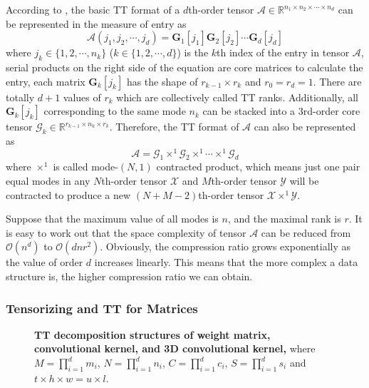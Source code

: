 \documentclass[a4paper,fleqn]{cas-dc}
\begin{document}
According to \citet{Oseledets_2011_InventTT}, the basic TT format of a \(d\)th-order tensor \(\bm{\mathcal{A}} \in \mathbb{R} ^{n_{1} \times n_{2} \times \cdots \times n_{d}}\) can be represented in the measure of entry as
\begin{equation}\label{Eq_TTBaseElement}
\mathcal{A}(j_{1},j_{2},\cdots,j_{d}) = \bm{G}_{1}[j_{1}] \bm{G}_{2}[j_{2}] \cdots \bm{G}_{d}[j_{d}]
\end{equation}
where \( j_{k} \in \{1,2,\cdots,n_{k}\} \) (\( k \in \{1,2,\cdots,d\} \)) is the \( k \)th index of the entry in tensor \( \bm{\mathcal{A}} \), serial products on the right side of the equation are core matrices to calculate the entry, each matrix \( \bm{G}_{k}[j_{k}] \) has the shape of \( r_{k-1} \times r_{k} \) and \( r_{0}=r_{d}=1 \). There are totally \( d+1 \) values of \( r_{k} \) which are collectively called TT ranks.  Additionally, all \( \bm{G}_{k}[j_{k}] \) corresponding to the same mode \(n_{k}\) can be stacked into a \( 3 \)rd-order core tensor \( \bm{\mathcal{G}}_{k} \in \mathbb{R} ^{r_{k-1} \times n_{k} \times r_{k}} \). Therefore, the TT format of \(\bm{\mathcal{A}}\) can also be represented as \citep{Lee_2016_HTTT}
\begin{equation}\label{Eq_TTBaseTensor}
\bm{\mathcal{A}} = \bm{\mathcal{G}}_{1} \times ^{1} \bm{\mathcal{G}}_{2} \times ^{1} \cdots \times ^{1} \bm{\mathcal{G}}_{d}
\end{equation}
where \( \times ^{1} \) is called mode-\( (N,1) \) contracted product, which means just one pair equal modes in any \( N \)th-order tensor \( \bm{\mathcal{X}} \) and \( M \)th-order tensor \( \bm{\mathcal{Y}} \) will be contracted to produce a new \( (N+M-2) \)th-order tensor \(\bm{\mathcal{X}} \times ^{1} \bm{\mathcal{Y}}\).

Suppose that the maximum value of all modes is \(n\), and the maximal rank is \(r\). It is easy to work out that the space complexity of tensor \(\bm{\mathcal{A}}\) can be reduced from \(\mathcal{O}(n^{d})\) to \(\mathcal{O}(dnr^2)\). Obviously, the compression ratio grows exponentially as the value of order \(d\) increases linearly. This means that the more complex a data structure is, the higher compression ratio we can obtain.

\subsubsection{Tensorizing and TT for Matrices}\quad

\begin{figure*}
\centering
{}
\caption{\textbf{TT decomposition structures of weight matrix, convolutional kernel, and 3D convolutional kernel,} where \(M = \prod_{i=1}^d m_i\), \(N = \prod_{i=1}^d n_i\), \(C = \prod_{i=1}^d c_i\), \(S = \prod_{i=1}^d s_i\) and \(t\times h \times w=u \times l\).}
\label{Fig_tt_structure}
\end{figure*}
\end{document}
